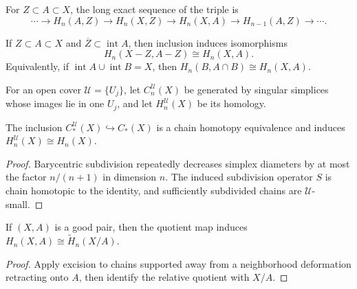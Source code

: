 For $Z\subset A\subset X$, the long exact sequence of the triple is
\[
\cdots\to H_n(A,Z)\to H_n(X,Z)\to H_n(X,A)\to H_{n-1}(A,Z)\to\cdots.
\]

\begin{theorem}
\label{thm:excision-general}

If $Z\subset A\subset X$ and $\overline Z\subset\operatorname{int}A$, then inclusion induces isomorphisms
\[
H_n(X-Z,A-Z)\cong H_n(X,A).
\]
Equivalently, if $\operatorname{int}A\cup\operatorname{int}B=X$, then $H_n(B,A\cap B)\cong H_n(X,A)$.
\end{theorem}

For an open cover $\mathcal U=\{U_j\}$, let $C_n^{\mathcal U}(X)$ be generated by singular simplices whose images lie in one $U_j$, and let $H_n^{\mathcal U}(X)$ be its homology.

\begin{proposition}
\label{prop:inclusion-u-chains-homotopy-equivalence}

The inclusion $C_*^{\mathcal U}(X)\hookrightarrow C_*(X)$ is a chain homotopy equivalence and induces $H_n^{\mathcal U}(X)\cong H_n(X)$.
\end{proposition}
\begin{proof}
\sketch Barycentric subdivision repeatedly decreases simplex diameters by at most the factor $n/(n+1)$ in dimension $n$.  The induced subdivision operator $S$ is chain homotopic to the identity, and sufficiently subdivided chains are $\mathcal U$-small.
\end{proof}

\begin{proposition}
\label{prop:good-pairs-absolute-homology}

If $(X,A)$ is a good pair, then the quotient map induces $H_n(X,A)\cong\widetilde H_n(X/A)$.
\end{proposition}
\begin{proof}
\sketch Apply excision to chains supported away from a neighborhood deformation retracting onto $A$, then identify the relative quotient with $X/A$.
\end{proof}

